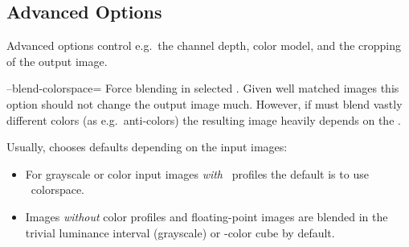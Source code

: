 

\subsection[Advanced Options\commonpart]{Advanced Options\commonpart
  \label{sec:advanced-options}
  }

Advanced options control e.g.\ the channel depth, color model, and the
cropping of the output image.

\begin{codelist}
  \label{opt:blend-colorspace}%
\item[--blend-colorspace=\metavar{COLORSPACE}]\itemend Force blending
  in selected .  Given well matched images this
  option should not change the output image much.  However, if \App{}
  must blend vastly different colors (as e.g.\ anti-colors) the
  resulting image heavily depends on the .

  Usually, \App{} chooses defaults depending on the input images:

  \begin{itemize}
  \item
    For grayscale or color input images \emph{with}
    ~profiles%
     the
    default is to use
    ~colorspace.
  \item
    Images \emph{without} color profiles and floating-point images are
    blended in the trivial luminance interval (grayscale) or
    -color cube%
    by default.
  \end{itemize}


\end{codelist}
